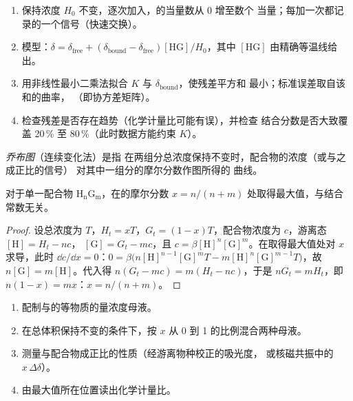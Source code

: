 \begin{method}[由核磁共振滴定求结合常数]\label{met:b3:supramolecular:nmr-titration}
\begin{enumerate}
  \item 保持浓度 $H_0$ 不变，逐次加入，的当量数从 0 增至数个
        当量；每加一次都记录的一个信号（快速交换）。
  \item 模型：$\delta = \delta_{\mathrm{free}} + (\delta_{\mathrm{bound}} - \delta_{\mathrm{free}})[\mathrm{HG}]/H_0$，其中 $[\mathrm{HG}]$ 由精确等温线给出。
  \item 用非线性最小二乘法拟合 $K$ 与 $\delta_{\mathrm{bound}}$，使残差平方和
        最小；标准误差取自该和的曲率，
        （即协方差矩阵）。
  \item 检查残差是否存在趋势（化学计量比可能有误），并检查
        结合分数是否大致覆盖 20\,\% 至 80\,\%（此时数据方能约束 $K$）。
\end{enumerate}
\end{method}

\begin{definition}[乔布图]\label{def:b3:supramolecular:job}
\emph{乔布图}（连续变化法）是指
在两组分总浓度保持不变时，配合物的浓度（或与之成正比的信号）
对其中一组分的摩尔分数作图所得的
曲线。
\end{definition}

\begin{proposition}[乔布图的最大值]\label{prop:b3:supramolecular:job}
对于单一配合物 $\mathrm{H_nG_m}$，在的摩尔分数
$x = n/(n + m)$ 处取得最大值，与结合常数无关。
\end{proposition}

\begin{proof}
设总浓度为 $T$，$H_t = xT$，$G_t = (1 - x)T$，配合物浓度为 $c$，游离态 $[\mathrm H] = H_t - nc$，
$[\mathrm G] = G_t - mc$，且 $c = \beta[\mathrm H]^n[\mathrm G]^m$。在取得最大值处对 $x$ 求导，此时
$\dd c/\dd x = 0$：$0 = \beta\bigl(n[\mathrm H]^{n-1}[\mathrm G]^m T - m[\mathrm H]^n[\mathrm G]^{m-1}T\bigr)$，故 $n[\mathrm G] = m[\mathrm H]$。代入得
$n(G_t - mc) = m(H_t - nc)$，于是 $nG_t = mH_t$，即 $n(1 - x) = mx$：$x = n/(n + m)$。
\end{proof}

\begin{method}[乔布图的测定]\label{met:b3:supramolecular:job}
\begin{enumerate}
  \item 配制与的等物质的量浓度母液。
  \item 在总体积保持不变的条件下，按 $x$ 从 0 到 1 的比例混合两种母液。
  \item 测量与配合物成正比的性质（经游离物种校正的吸光度，
        或核磁共振中的 $x\,\Delta\delta$）。
  \item 由最大值所在位置读出化学计量比。
\end{enumerate}
\end{method}

